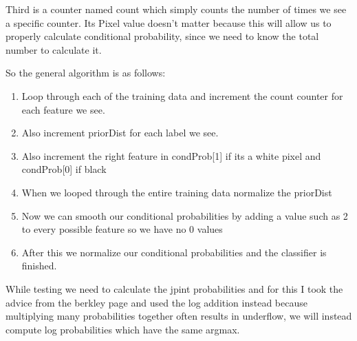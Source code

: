 \documentclass[11]{article}
\begin{document}
Third is a counter named count which simply counts the number of times we see a specific counter. Its Pixel value doesn't matter because this will allow us to properly calculate conditional probability, since we need to know the total number to calculate it.

So the general algorithm is as follows:
\begin{enumerate} 
	\item Loop through each of the training data and increment the count counter for each feature we see.
	\item Also increment priorDist for each label we see.
	\item Also increment the right feature in condProb[1] if its a white pixel and condProb[0] if black
	\item When we looped through the entire training data normalize the priorDist
	\item Now we can smooth our conditional probabilities by adding a value such as 2 to every possible feature so we have no 0 values
	\item After this we normalize our conditional probabilities and the classifier is finished.
\end{enumerate}

While testing we need to calculate the jpint probabilities and for this I took the advice from the berkley page and used the log addition instead because multiplying many probabilities together often results in underflow, we will instead compute log probabilities which have the same argmax.
\end{document}
